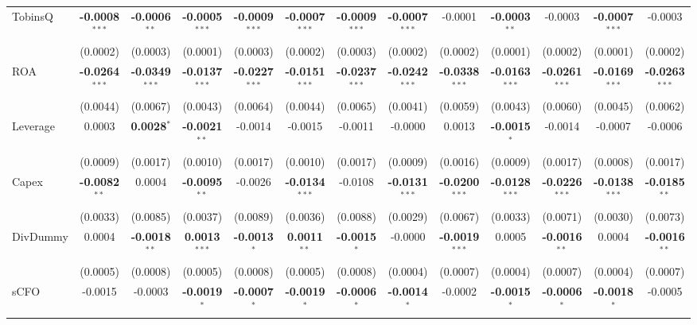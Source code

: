\begin{landscape}
\begin{table}[H]
\begin{tabular}{lcccccccccccc}
TobinsQ & \textbf{-0.0008}$^{***}$ & \textbf{-0.0006}$^{**}$ & \textbf{-0.0005}$^{***}$ & \textbf{-0.0009}$^{***}$ & \textbf{-0.0007}$^{***}$ & \textbf{-0.0009}$^{***}$ & \textbf{-0.0007}$^{***}$ & -0.0001 & \textbf{-0.0003}$^{**}$ & -0.0003 & \textbf{-0.0007}$^{***}$ & -0.0003 \\
 & (0.0002) & (0.0003) & (0.0001) & (0.0003) & (0.0002) & (0.0003) & (0.0002) & (0.0002) & (0.0001) & (0.0002) & (0.0001) & (0.0002) \\
ROA & \textbf{-0.0264}$^{***}$ & \textbf{-0.0349}$^{***}$ & \textbf{-0.0137}$^{***}$ & \textbf{-0.0227}$^{***}$ & \textbf{-0.0151}$^{***}$ & \textbf{-0.0237}$^{***}$ & \textbf{-0.0242}$^{***}$ & \textbf{-0.0338}$^{***}$ & \textbf{-0.0163}$^{***}$ & \textbf{-0.0261}$^{***}$ & \textbf{-0.0169}$^{***}$ & \textbf{-0.0263}$^{***}$ \\
 & (0.0044) & (0.0067) & (0.0043) & (0.0064) & (0.0044) & (0.0065) & (0.0041) & (0.0059) & (0.0043) & (0.0060) & (0.0045) & (0.0062) \\
Leverage & 0.0003 & \textbf{0.0028}$^{*}$ & \textbf{-0.0021}$^{**}$ & -0.0014 & -0.0015 & -0.0011 & -0.0000 & 0.0013 & \textbf{-0.0015}$^{*}$ & -0.0014 & -0.0007 & -0.0006 \\
 & (0.0009) & (0.0017) & (0.0010) & (0.0017) & (0.0010) & (0.0017) & (0.0009) & (0.0016) & (0.0009) & (0.0017) & (0.0008) & (0.0017) \\
Capex & \textbf{-0.0082}$^{**}$ & 0.0004 & \textbf{-0.0095}$^{**}$ & -0.0026 & \textbf{-0.0134}$^{***}$ & -0.0108 & \textbf{-0.0131}$^{***}$ & \textbf{-0.0200}$^{***}$ & \textbf{-0.0128}$^{***}$ & \textbf{-0.0226}$^{***}$ & \textbf{-0.0138}$^{***}$ & \textbf{-0.0185}$^{**}$ \\
 & (0.0033) & (0.0085) & (0.0037) & (0.0089) & (0.0036) & (0.0088) & (0.0029) & (0.0067) & (0.0033) & (0.0071) & (0.0030) & (0.0073) \\
DivDummy & 0.0004 & \textbf{-0.0018}$^{**}$ & \textbf{0.0013}$^{***}$ & \textbf{-0.0013}$^{*}$ & \textbf{0.0011}$^{**}$ & \textbf{-0.0015}$^{*}$ & -0.0000 & \textbf{-0.0019}$^{***}$ & 0.0005 & \textbf{-0.0016}$^{**}$ & 0.0004 & \textbf{-0.0016}$^{**}$ \\
 & (0.0005) & (0.0008) & (0.0005) & (0.0008) & (0.0005) & (0.0008) & (0.0004) & (0.0007) & (0.0004) & (0.0007) & (0.0004) & (0.0007) \\
sCFO & -0.0015 & -0.0003 & \textbf{-0.0019}$^{*}$ & \textbf{-0.0007}$^{*}$ & \textbf{-0.0019}$^{*}$ & \textbf{-0.0006}$^{*}$ & \textbf{-0.0014}$^{*}$ & -0.0002 & \textbf{-0.0015}$^{*}$ & \textbf{-0.0006}$^{*}$ & \textbf{-0.0018}$^{*}$ & -0.0005 \\

\end{tabular}
\end{table}
\end{landscape}
